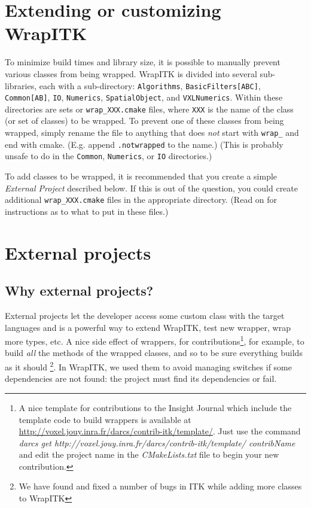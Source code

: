 \documentclass{InsightArticle}
\begin{document}
  \section{Extending or customizing WrapITK}

To minimize build times and library size, it is possible to manually prevent
various classes from being wrapped. WrapITK is divided into several
sub-libraries, each with a sub-directory: \verb$Algorithms$, \verb$BasicFilters[ABC]$,
\verb$Common[AB]$, \verb$IO$, \verb$Numerics$, \verb$SpatialObject$, and \verb$VXLNumerics$. Within these
directories are sets or \verb$wrap_XXX.cmake$ files, where \verb$XXX$ is the name of the class
(or set of classes) to be wrapped. To prevent one of these classes from being
wrapped, simply rename the file to anything that does {\em not} start with \verb$wrap_$ and
end with cmake. (E.g. append \verb$.notwrapped$ to the name.) (This is probably
unsafe to do in the \verb$Common$, \verb$Numerics$, or \verb$IO$ directories.)

To add classes to be wrapped, it is recommended that you create a simple
{\em External Project} described below. If this is out of the question, you could
create additional \verb$wrap_XXX.cmake$ files in the appropriate directory. (Read on
for instructions as to what to put in these files.)


  \section{External projects}

    \subsection{Why external projects?}

External projects let the developer access some custom class with the target languages
and is a powerful way to extend WrapITK, test new wrapper, wrap more types, etc.
A nice side effect of wrappers, for contributions\footnote{A nice template for
contributions to the Insight Journal \cite{InsightJournalWebSite} which include the 
template code to build wrappers is available at
\url{http://voxel.jouy.inra.fr/darcs/contrib-itk/template/}. Just use the command
{\em darcs get http://voxel.jouy.inra.fr/darcs/contrib-itk/template/ contribName}
and edit the project name in the {\em CMakeLists.txt} file to
begin your new contribution.}, for example, to build {\em all}
the methods of the wrapped classes, and so to be sure everything builds as it should
\footnote{We have found and fixed  a number of bugs in ITK while adding
more classes to WrapITK}.
In WrapITK, we used them to avoid managing switches if some dependencies are not
found: the project must find its dependencies or fail.
\end{document}
